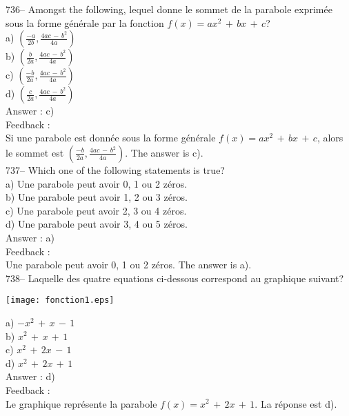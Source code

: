 \documentclass[letterpaper, 12pt]{article}
\begin{document}
736-- Amongst the following, lequel donne le sommet de la parabole
exprim\'ee sous la forme g\'en\'erale par la fonction
$f(x)=ax^{2}\,+\,bx\,+\,c$?\\
a) $(\frac{-a}{2b},\frac{4ac\,-\,b^{2}}{4a})$\\[2mm]
b) $(\frac{b}{2a},\frac{4ac\,-\,b^{2}}{4a})$\\[2mm]
c) $(\frac{-b}{2a},\frac{4ac\,-\,b^{2}}{4a})$\\[2mm]
d) $(\frac{c}{2a},\frac{4ac\,-\,b^{2}}{4a})$\\

Answer : c)\\

Feedback : \\
Si une parabole est donn\'ee sous la forme g\'en\'erale
$f(x)=ax^{2}\,+\,bx\,+\,c$, alors le sommet est
$(\frac{-b}{2a},\frac{4ac\,-\,b^{2}}{4a})$.  The answer is c).\\

737-- Which one of the following statements is true?\\
a) Une parabole peut avoir 0, 1 ou 2 z\'eros.\\
b) Une parabole peut avoir 1, 2 ou 3 z\'eros.\\
c) Une parabole peut avoir 2, 3 ou 4 z\'eros.\\
d) Une parabole peut avoir 3, 4 ou 5 z\'eros.\\

Answer : a)\\

Feedback : \\
Une parabole peut avoir 0, 1 ou 2 z\'eros.  The answer is a).\\

738-- Laquelle des quatre equations ci-dessous correspond au graphique
suivant?\\
    \begin{center}
    \texttt{[image: fonction1.eps]}
    \end{center}

a) $-x^{2}\,+\,x\,-\,1$\\
b) $x^{2}\,+\,x\,+\,1$\\
c) $x^{2}\,+\,2x\,-\,1$\\
d) $x^{2}\,+\,2x\,+\,1$\\

Answer : d)\\

Feedback : \\
Le graphique repr\'esente la parabole $f(x)=x^{2}\,+\,2x\,+\,1$.  La
r\'eponse est d).\\
\end{document}
